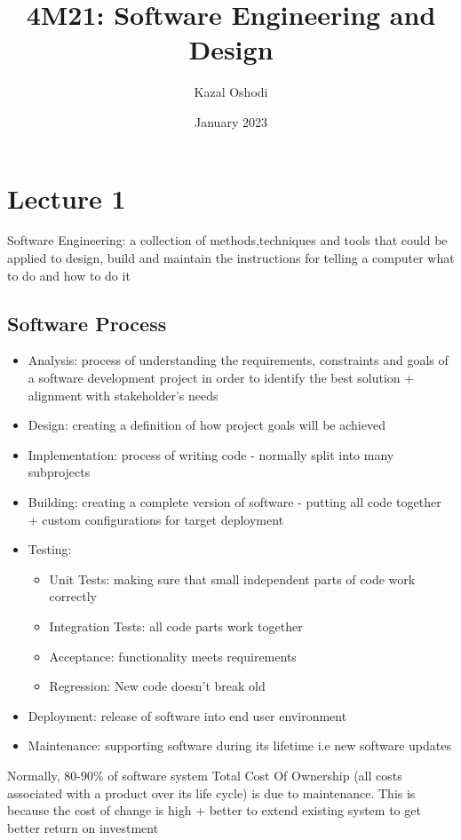 \documentclass{article}
\title{4M21: Software Engineering and Design}
\author{Kazal Oshodi }
\date{January 2023}
\begin{document}
\maketitle
\tableofcontents

\section{Lecture 1}
Software Engineering: a collection of methods,techniques and tools that could be applied to design, build and maintain the instructions for telling a computer what to do and how to do it
\subsection{Software Process}\label{sp}
\begin{itemize}
    \item Analysis: process of understanding the requirements, constraints and goals of a software development project in order to identify the best solution + alignment with stakeholder's needs
    \item Design: creating a definition of how project goals will be achieved
    \item Implementation: process of writing code - normally split into many subprojects
    \item Building: creating a complete version of software - putting all code together + custom configurations for target deployment
    \item Testing: 
    \begin{itemize} 
    \item Unit Tests: making sure that small independent parts of code work correctly 
    \item Integration Tests: all code parts work together
    \item Acceptance: functionality meets requirements
    \item Regression: New code doesn't break old
    \end{itemize}
    \item Deployment: release of software into end user environment
    \item Maintenance: supporting software during its lifetime i.e new software updates
\end{itemize}
Normally, 80-90\% of software system Total Cost Of Ownership (all costs associated with a product over its life cycle) is due to maintenance. This is because the cost of change is high + better to extend existing system to get better return on investment
\end{document}
